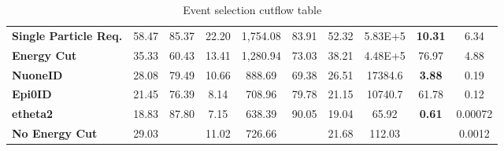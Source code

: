 \documentclass[12pt]{article}
\begin{document}
\begin{table}[!hb]
\begin{tabular}{|l|ccc|ccc|ccc|}
\textbf{Single Particle Req.}                            & 58.47                                  & 85.37     & 22.20     & 1,754.08                                         & 83.91     & 52.32     & 5.83E+5                                         & \textbf{10.31}     & 6.34      \\
\textbf{Energy Cut}                                      & 35.33                                  & 60.43     & 13.41     & 1,280.94                                         & 73.03     & 38.21     & 4.48E+5                                         & 76.97     & 4.88      \\
\textbf{NuoneID}                                         & 28.08                                  & 79.49     & 10.66     & 888.69                                          & 69.38     & 26.51     & 17384.6                                         & \textbf{3.88}      & 0.19      \\
\textbf{Epi0ID}                                          & 21.45                                  & 76.39     & 8.14      & 708.96                                          & 79.78     & 21.15     & 10740.7                                         & 61.78     & 0.12      \\
\rowcolor[HTML]{67FD9A} 
\textbf{etheta2}                                         & 18.83                                  & 87.80     & 7.15      & 638.39                                          & 90.05     & 19.04     & 65.92                                           & \textbf{0.61}      & 0.00072   \\\hline\hline
\textbf{No Energy Cut}                                   & 29.03                                  &           & 11.02     & 726.66                                          &           & 21.68     & 112.03                                          &           & 0.0012   \\\hline
\end{tabular}
\caption{Event selection cutflow table}
\label{tab:CutflowTableSignal}
\end{table}
\end{document}
